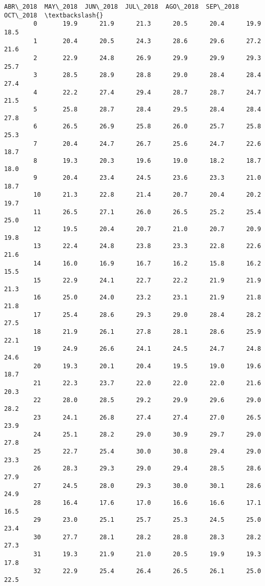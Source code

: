 \documentclass[11pt]{article}
\begin{document}
\begin{Verbatim}[commandchars=\\\{\}]
            ABR\_2018  MAY\_2018  JUN\_2018  JUL\_2018  AGO\_2018  SEP\_2018  OCT\_2018  \textbackslash{}
        0       19.9      21.9      21.3      20.5      20.4      19.9      18.5   
        1       20.4      20.5      24.3      28.6      29.6      27.2      21.6   
        2       22.9      24.8      26.9      29.9      29.9      29.3      25.7   
        3       28.5      28.9      28.8      29.0      28.4      28.4      27.4   
        4       22.2      27.4      29.4      28.7      28.7      24.7      21.5   
        5       25.8      28.7      28.4      29.5      28.4      28.4      27.8   
        6       26.5      26.9      25.8      26.0      25.7      25.8      25.3   
        7       20.4      24.7      26.7      25.6      24.7      22.6      18.7   
        8       19.3      20.3      19.6      19.0      18.2      18.7      18.0   
        9       20.4      23.4      24.5      23.6      23.3      21.0      18.7   
        10      21.3      22.8      21.4      20.7      20.4      20.2      19.7   
        11      26.5      27.1      26.0      26.5      25.2      25.4      25.0   
        12      19.5      20.4      20.7      21.0      20.7      20.9      19.8   
        13      22.4      24.8      23.8      23.3      22.8      22.6      21.6   
        14      16.0      16.9      16.7      16.2      15.8      16.2      15.5   
        15      22.9      24.1      22.7      22.2      21.9      21.9      21.3   
        16      25.0      24.0      23.2      23.1      21.9      21.8      21.8   
        17      25.4      28.6      29.3      29.0      28.4      28.2      27.5   
        18      21.9      26.1      27.8      28.1      28.6      25.9      22.1   
        19      24.9      26.6      24.1      24.5      24.7      24.8      24.6   
        20      19.3      20.1      20.4      19.5      19.0      19.6      18.7   
        21      22.3      23.7      22.0      22.0      22.0      21.6      20.3   
        22      28.0      28.5      29.2      29.9      29.6      29.0      28.2   
        23      24.1      26.8      27.4      27.4      27.0      26.5      23.9   
        24      25.1      28.2      29.0      30.9      29.7      29.0      27.8   
        25      22.7      25.4      30.0      30.8      29.4      29.0      23.3   
        26      28.3      29.3      29.0      29.4      28.5      28.6      27.9   
        27      24.5      28.0      29.3      30.0      30.1      28.6      24.9   
        28      16.4      17.6      17.0      16.6      16.6      17.1      16.5   
        29      23.0      25.1      25.7      25.3      24.5      25.0      23.4   
        30      27.7      28.1      28.2      28.8      28.3      28.2      27.3   
        31      19.3      21.9      21.0      20.5      19.9      19.3      17.8   
        32      22.9      25.4      26.4      26.5      26.1      25.0      22.5   
        

\end{Verbatim}
\end{document}

